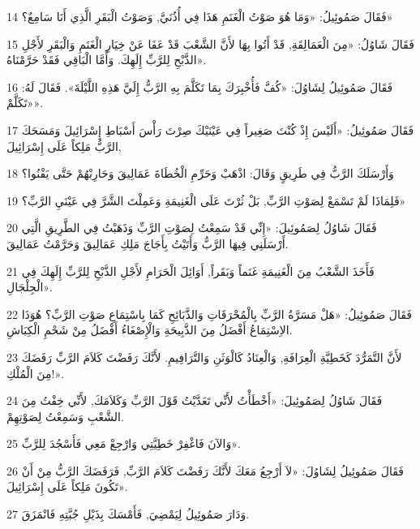 \par 14 فَقَالَ صَمُوئِيلُ: «وَمَا هُوَ صَوْتُ الْغَنَمِ هَذَا فِي أُذُنَيَّ, وَصَوْتُ الْبَقَرِ الَّذِي أَنَا سَامِعٌ؟»
\par 15 فَقَالَ شَاوُلُ: «مِنَ الْعَمَالِقَةِ, قَدْ أَتُوا بِهَا لأَنَّ الشَّعْبَ قَدْ عَفَا عَنْ خِيَارِ الْغَنَمِ وَالْبَقَرِ لأَجْلِ الذَّبْحِ لِلرَّبِّ إِلَهِكَ. وَأَمَّا الْبَاقِي فَقَدْ حَرَّمْنَاهُ».
\par 16 فَقَالَ صَمُوئِيلُ لِشَاوُلَ: «كُفَّ فَأُخْبِرَكَ بِمَا تَكَلَّمَ بِهِ الرَّبُّ إِلَيَّ هَذِهِ اللَّيْلَةَ». فَقَالَ لَهُ: «تَكَلَّمْ».
\par 17 فَقَالَ صَمُوئِيلُ: «أَلَيْسَ إِذْ كُنْتَ صَغِيراً فِي عَيْنَيْكَ صِرْتَ رَأْسَ أَسْبَاطِ إِسْرَائِيلَ وَمَسَحَكَ الرَّبُّ مَلِكاً عَلَى إِسْرَائِيلَ,
\par 18 وَأَرْسَلَكَ الرَّبُّ فِي طَرِيقٍ وَقَالَ: اذْهَبْ وَحَرِّمِ الْخُطَاةَ عَمَالِيقَ وَحَارِبْهُمْ حَتَّى يَفْنُوا؟
\par 19 فَلِمَاذَا لَمْ تَسْمَعْ لِصَوْتِ الرَّبِّ, بَلْ ثُرْتَ عَلَى الْغَنِيمَةِ وَعَمِلْتَ الشَّرَّ فِي عَيْنَيِ الرَّبِّ؟»
\par 20 فَقَالَ شَاوُلُ لِصَمُوئِيلَ: «إِنِّي قَدْ سَمِعْتُ لِصَوْتِ الرَّبِّ وَذَهَبْتُ فِي الطَّرِيقِ الَّتِي أَرْسَلَنِي فِيهَا الرَّبُّ وَأَتَيْتُ بِأَجَاجَ مَلِكِ عَمَالِيقَ وَحَرَّمْتُ عَمَالِيقَ.
\par 21 فَأَخَذَ الشَّعْبُ مِنَ الْغَنِيمَةِ غَنَماً وَبَقَراً, أَوَائِلَ الْحَرَامِ لأَجْلِ الذَّبْحِ لِلرَّبِّ إِلَهِكَ فِي الْجِلْجَالِ».
\par 22 فَقَالَ صَمُوئِيلُ: «هَلْ مَسَرَّةُ الرَّبِّ بِالْمُحْرَقَاتِ وَالذَّبَائِحِ كَمَا بِاسْتِمَاعِ صَوْتِ الرَّبِّ؟ هُوَذَا الاِسْتِمَاعُ أَفْضَلُ مِنَ الذَّبِيحَةِ وَالْإِصْغَاءُ أَفْضَلُ مِنْ شَحْمِ الْكِبَاشِ.
\par 23 لأَنَّ التَّمَرُّدَ كَخَطِيَّةِ الْعِرَافَةِ, وَالْعِنَادُ كَالْوَثَنِ وَالتَّرَافِيمِ. لأَنَّكَ رَفَضْتَ كَلاَمَ الرَّبِّ رَفَضَكَ مِنَ الْمُلْكِ!».
\par 24 فَقَالَ شَاوُلُ لِصَمُوئِيلَ: «أَخْطَأْتُ لأَنِّي تَعَدَّيْتُ قَوْلَ الرَّبِّ وَكَلاَمَكَ, لأَنِّي خِفْتُ مِنَ الشَّعْبِ وَسَمِعْتُ لِصَوْتِهِمْ.
\par 25 وَالآنَ فَاغْفِرْ خَطِيَّتِي وَارْجِعْ مَعِي فَأَسْجُدَ لِلرَّبِّ».
\par 26 فَقَالَ صَمُوئِيلُ لِشَاوُلَ: «لاَ أَرْجِعُ مَعَكَ لأَنَّكَ رَفَضْتَ كَلاَمَ الرَّبِّ, فَرَفَضَكَ الرَّبُّ مِنْ أَنْ تَكُونَ مَلِكاً عَلَى إِسْرَائِيلَ».
\par 27 وَدَارَ صَمُوئِيلُ لِيَمْضِيَ, فَأَمْسَكَ بِذَيْلِ جُبَّتِهِ فَانْمَزَقَ.
